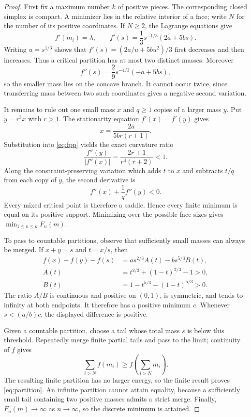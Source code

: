\documentclass[11pt]{article}
\begin{document}
\begin{proof}
First fix a maximum number $k$ of positive pieces.  The corresponding closed
simplex is compact.  A minimizer lies in the relative interior of a face;
write $N$ for the number of its positive coordinates.  If $N\ge2$, the
Lagrange equations give
\[
 f'(m_i)=\lambda,\qquad
 f'(s)=\frac13s^{-1/3}(2a+5bs).
\]
Writing $u=s^{1/3}$ shows that $f'(s)=(2a/u+5bu^2)/3$ first decreases and
then increases.  Thus a critical partition has at most two distinct masses.
Moreover
\begin{equation}\label{eq:fpp}
 f''(s)=\frac29s^{-4/3}(-a+5bs),
\end{equation}
so the smaller mass lies on the concave branch.  It cannot occur twice,
since transferring mass between two such coordinates gives a negative
second variation.

It remains to rule out one small mass $x$ and $q\ge1$ copies of a larger
mass $y$.  Put $y=r^3x$ with $r>1$.  The stationarity equation
$f'(x)=f'(y)$ gives
\begin{equation}\label{eq:mixed-x}
 x=\frac{2a}{5br(r+1)}.
\end{equation}
Substitution into \eqref{eq:fpp} yields the exact curvature ratio
\begin{equation}\label{eq:ratio}
 \frac{f''(y)}{|f''(x)|}
 =\frac{2r+1}{r^3(r+2)}<1.
\end{equation}
Along the constraint-preserving variation which adds $t$ to $x$ and
subtracts $t/q$ from each copy of $y$, the second derivative is
\[
 f''(x)+\frac1q f''(y)<0.
\]
Every mixed critical point is therefore a saddle.  Hence every finite
minimum is equal on its positive support.  Minimizing over the possible face
sizes gives $\min_{1\le n\le k}F_n(m)$.

To pass to countable partitions, observe that sufficiently small masses can
always be merged.  If $x+y=s$ and $t=x/s$, then
\begin{align*}
 f(x)+f(y)-f(s)
 &=a s^{2/3}A(t)-b s^{5/3}B(t),\\
 A(t)&=t^{2/3}+(1-t)^{2/3}-1>0,\\
 B(t)&=1-t^{5/3}-(1-t)^{5/3}>0.
\end{align*}
The ratio $A/B$ is continuous and positive on $(0,1)$, is symmetric, and
tends to infinity at both endpoints.  It therefore has a positive minimum
$c$.  Whenever $s<(a/b)c$, the displayed difference is positive.

Given a countable partition, choose a tail whose total mass $s$ is below
this threshold. Repeatedly merge finite partial tails and pass to the limit;
continuity of $f$ gives
\[
 \sum_{i>N}f(m_i)\ge f\left(\sum_{i>N}m_i\right).
\]
The resulting finite partition has no larger energy, so the finite result
proves \eqref{eq:partition}.  An infinite partition cannot attain equality,
because a sufficiently small tail containing two positive masses admits a
strict merge.  Finally, $F_n(m)\to\infty$ as $n\to\infty$, so the discrete
minimum is attained.
\end{proof}
\end{document}
